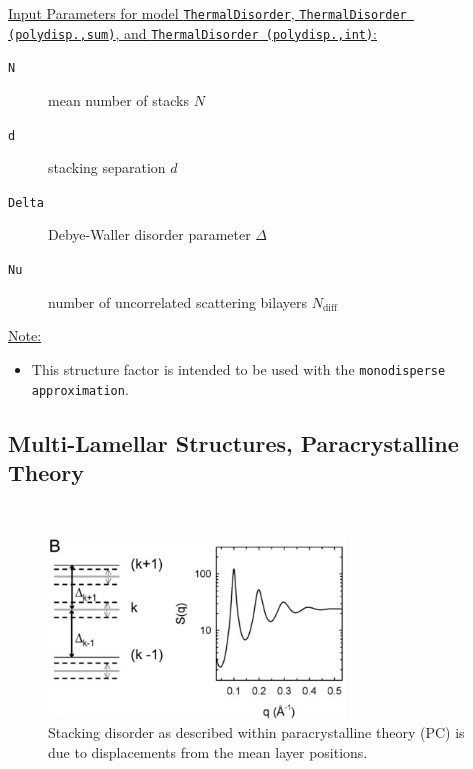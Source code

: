 \noindent
\uline{Input Parameters for model \texttt{ThermalDisorder}, \texttt{ThermalDisorder (polydisp.,sum)}, and \texttt{ThermalDisorder (polydisp.,int)}:}
\begin{description}
\item[\texttt{N}] mean number of stacks $N$
\item[\texttt{d}] stacking separation $d$
\item[\texttt{Delta}]  Debye-Waller disorder parameter $\Delta$
\item[\texttt{Nu}]   number of uncorrelated scattering bilayers $N_\text{diff}$
\end{description}

\noindent\uline{Note:}
\begin{itemize}
\item This structure factor is intended to be used with the \texttt{monodisperse approximation}.
\end{itemize}


\subsection{Multi-Lamellar Structures, Paracrystalline Theory} ~\\

\begin{figure}[htb]
\begin{center}
\includegraphics[width=0.7\textwidth]{ParacrystallineTheorySQ.png}
\end{center}
\caption{Stacking disorder as described within paracrystalline
theory (PC) is due to displacements from the mean layer
positions.} \label{ParacrystallineTheorySQ}
\end{figure}


